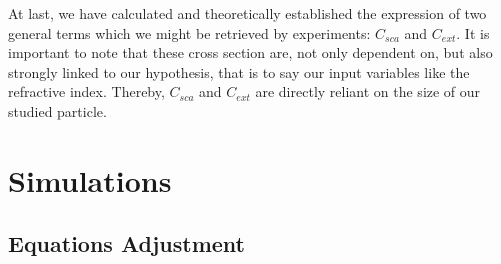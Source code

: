 \documentclass{article}
\numberwithin{equation}{section}
\begin{document}
At last, we have calculated and theoretically established the expression of two general terms which we might be retrieved by experiments: $C_{sca}$ and $C_{ext}$. It is important to note that these cross section are, not only dependent on, but also strongly linked to our hypothesis, that is to say our input variables like the refractive index. Thereby, $C_{sca}$ and $C_{ext}$ are directly reliant on the size of our studied particle.

\section{Simulations}

\subsection{Equations Adjustment}
\end{document}
